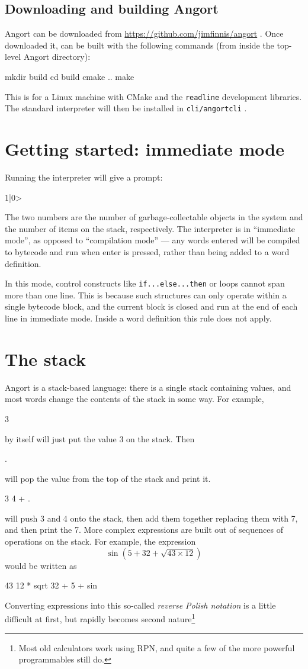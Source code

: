 \subsection{Downloading and building Angort}
Angort can be downloaded from \url{https://github.com/jimfinnis/angort} .
Once downloaded it, can be built with the following commands (from
inside the top-level Angort directory):
\begin{v}
mkdir build
cd build
cmake ..
make
\end{v}
This is for a Linux machine
with CMake and the \texttt{readline} development libraries. The standard
interpreter will then be installed in \texttt{cli/angortcli} .

\section{Getting started: immediate mode}
Running the interpreter will give a prompt:
\begin{v}
1|0>
\end{v}
The two numbers are the number of garbage-collectable objects in the
system and the number of items on the stack, respectively.
The interpreter is in ``immediate mode'', as opposed to ``compilation
mode'' --- any words entered will be compiled to bytecode and run when
enter is pressed,
rather than being added to a word definition.

In this mode, control constructs like
\texttt{if...else...then} or loops cannot span more than one
line. This is because such structures can only operate within a single 
bytecode block, and the current block is closed and run at the end of each
line in immediate mode. Inside a word definition this rule does not apply.


\section{The stack}
Angort is a stack-based language: there is a single stack containing
values, and most words change the contents
of the stack in some way. For example,
\begin{v}
3
\end{v}
by itself will just put the value 3 on the stack. Then
\begin{v}
.
\end{v}
will pop the value from the top of the stack and print it.
\begin{v}
3 4 + .
\end{v}
will push 3 and 4 onto the stack, then add them together replacing them
with 7, and then print the 7. More complex expressions are built 
out of sequences of operations on the stack. For example, the expression
\[
\sin(5+32+\sqrt{43 \times 12})
\]
would be written as
\begin{v}
43 12 * sqrt 32 + 5 + sin
\end{v}
Converting expressions into this so-called \emph{reverse Polish notation}
is a little difficult at first, but rapidly becomes second
nature\footnote{Most old calculators work using RPN, and quite a few
of the more powerful programmables still do.}

